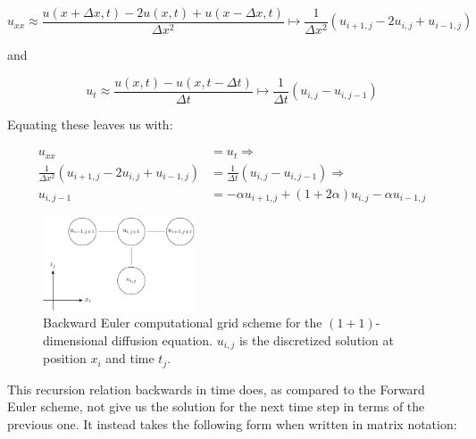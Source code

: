 \documentclass[a4paper, 11pt, notitlepage,english]{article}
\begin{document}
\begin{equation}
u_{xx} \approx \frac{u(x+\Delta x,t)-2u(x,t)+u(x-\Delta x, t)}{\Delta x^2} \mapsto \frac{1}{\Delta x^2} (u_{i+1,j}-2u_{i,j}+u_{i-1,j})
\label{eq:Backward_uxx}
\end{equation}

and

\begin{equation}
u_{t} \approx \frac{u(x,t)-u(x,t-\Delta t)}{\Delta t} \mapsto \frac{1}{\Delta t} (u_{i,j}-u_{i,j-1})
\label{eq:Backward_ut}
\end{equation}

Equating these leaves us with:

\begin{align}
u_{xx} &= u_t \Rightarrow \\
 \frac{1}{\Delta x^2} (u_{i+1,j}-2u_{i,j}+u_{i-1,j}) &= \frac{1}{\Delta t} (u_{i,j}-u_{i,j-1}) \Rightarrow \\
 u_{i,j-1} &= -\alpha u_{i+1,j} + (1+2\alpha)u_{i,j} - \alpha u_{i-1,j}
\label{eq:Backward_Euler_scheme}
\end{align}

\begin{figure}[h!tb]
 \centering
 \includegraphics[width=0.4\textwidth]{Grid_BE-figure0}
 \caption{Backward Euler computational grid scheme for the $(1+1)$-dimensional diffusion equation. $u_{i,j}$ is the discretized solution at position $x_i$ and time $t_j$.}
 \label{fig:BE_grid}
\end{figure}

This recursion relation backwards in time does, as compared to the Forward Euler scheme, not give us the solution for the next time step in terms of the previous one. It instead takes the following form when written in matrix notation:
\end{document}
